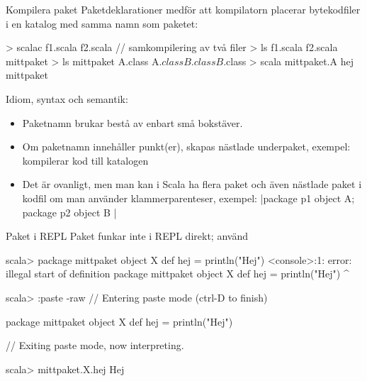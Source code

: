 \begin{Slide}{Kompilera paket}\SlideFontSmall
Paketdeklarationer medför att kompilatorn placerar bytekodfiler i en katalog med samma namn som paketet:
\begin{REPL}
> scalac f1.scala f2.scala     // samkompilering av två filer
> ls
f1.scala  f2.scala  mittpaket
> ls mittpaket
A.class  A$.class  B.class  B$.class
> scala mittpaket.A
hej mittpaket
\end{REPL}
\pause
Idiom, syntax och semantik:
\begin{itemize}
  \item Paketnamn brukar bestå av enbart små bokstäver.
  \item Om paketnamn innehåller punkt(er), skapas nästlade underpaket, exempel:   kompilerar kod till katalogen 
  \item Det är ovanligt, men man kan i Scala ha flera paket och även nästlade paket i  kodfil
  om man använder klammerparenteser, exempel:
  \code|package p1 { object A; package p2 { object B }}|
\end{itemize}
\end{Slide}

\begin{Slide}{Paket i REPL}
Paket funkar inte i REPL direkt; använd 

\begin{REPLnonum}
scala> package mittpaket { object X { def hej = println("Hej") } }
<console>:1: error: illegal start of definition
       package mittpaket { object X { def hej = println("Hej") } }
       ^

scala> :paste -raw
// Entering paste mode (ctrl-D to finish)

package mittpaket { object X { def hej = println("Hej") } }

// Exiting paste mode, now interpreting.


scala> mittpaket.X.hej
Hej

\end{REPLnonum}

\end{Slide}




